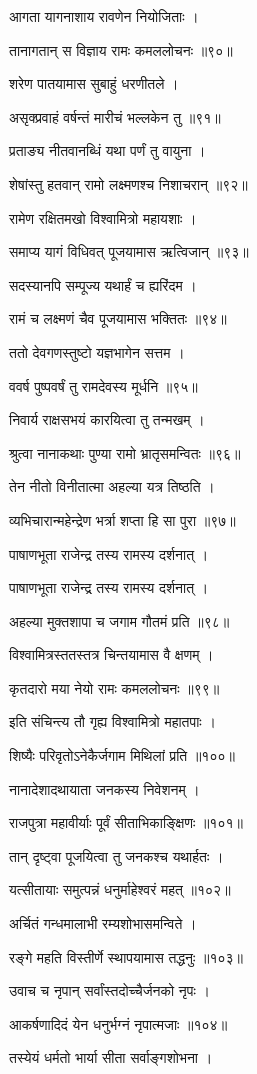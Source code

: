 आगता यागनाशाय रावणेन नियोजिताः ।

तानागतान् स विज्ञाय रामः कमललोचनः ॥९०॥

शरेण पातयामास सुबाहुं धरणीतले ।

असृक्प्रवाहं वर्षन्तं मारीचं भल्लकेन तु ॥९१॥

प्रताङ्य नीतवानब्धिं यथा पर्णं तु वायुना ।

शेषांस्तु हतवान् रामो लक्ष्मणश्च निशाचरान् ॥९२॥

रामेण रक्षितमखो विश्वामित्रो महायशाः ।

समाप्य यागं विधिवत् पूजयामास ऋत्विजान् ॥९३॥

सदस्यानपि सम्पूज्य यथार्हं च ह्यरिंदम ।

रामं च लक्ष्मणं चैव पूजयामास भक्तितः ॥९४॥

ततो देवगणस्तुष्टो यज्ञभागेन सत्तम ।

ववर्ष पुष्पवर्षं तु रामदेवस्य मूर्धनि ॥९५॥

निवार्य राक्षसभयं कारयित्वा तु तन्मखम् ।

श्रुत्वा नानाकथाः पुण्या रामो भ्रातृसमन्वितः ॥९६॥

तेन नीतो विनीतात्मा अहल्या यत्र तिष्ठति ।

व्यभिचारान्महेन्द्रेण भर्त्रा शप्ता हि सा पुरा ॥९७॥

पाषाणभूता राजेन्द्र तस्य रामस्य दर्शनात् ।

पाषाणभूता राजेन्द्र तस्य रामस्य दर्शनात् ।

अहल्या मुक्तशापा च जगाम गौतमं प्रति ॥९८॥

विश्वामित्रस्ततस्तत्र चिन्तयामास वै क्षणम् ।

कृतदारो मया नेयो रामः कमललोचनः ॥९९॥

इति संचिन्त्य तौ गृह्य विश्वामित्रो महातपाः ।

शिष्यैः परिवृतोऽनेकैर्जगाम मिथिलां प्रति ॥१००॥

नानादेशादथायाता जनकस्य निवेशनम् ।

राजपुत्रा महावीर्याः पूर्वं सीताभिकाङ्क्षिणः ॥१०१॥

तान् दृष्ट्वा पूजयित्वा तु जनकश्च यथार्हतः ।

यत्सीतायाः समुत्पन्नं धनुर्माहेश्वरं महत् ॥१०२॥

अर्चितं गन्धमालाभी रम्यशोभासमन्विते ।

रङ्गे महति विस्तीर्णे स्थापयामास तद्धनुः ॥१०३॥

उवाच च नृपान् सर्वांस्तदोच्चैर्जनको नृपः ।

आकर्षणादिदं येन धनुर्भग्नं नृपात्मजाः ॥१०४॥

तस्येयं धर्मतो भार्या सीता सर्वाङ्गशोभना ।

